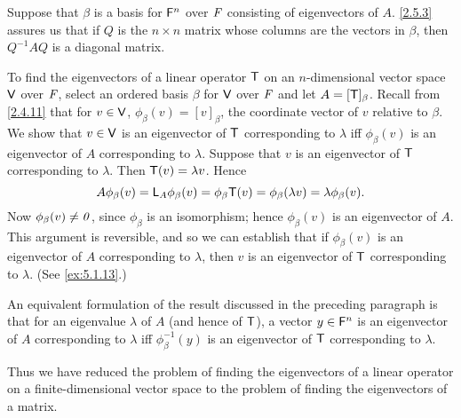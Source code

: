 \begin{note}
	Suppose that \(\beta\) is a basis for \(\mathsf{F}^n\) over \(\mathit{F}\) consisting of eigenvectors of \(A\).
	\cref{2.5.3} assures us that if \(Q\) is the \(n \times n\) matrix whose columns are the vectors in \(\beta\), then \(Q^{-1} A Q\) is a diagonal matrix.

	To find the eigenvectors of a linear operator \(\mathsf{T}\) on an \(n\)-dimensional vector space \(\mathsf{V}\) over \(\mathit{F}\), select an ordered basis \(\beta\) for \(\mathsf{V}\) over \(\mathit{F}\) and let \(A = [\mathsf{T}]_{\beta}\).
	Recall from \cref{2.4.11} that for \(v \in \mathsf{V}\), \(\phi_{\beta}(v) = [v]_{\beta}\), the coordinate vector of \(v\) relative to \(\beta\).
	We show that \(v \in \mathsf{V}\) is an eigenvector of \(\mathsf{T}\) corresponding to \(\lambda\) iff \(\phi_{\beta}(v)\) is an eigenvector of \(A\) corresponding to \(\lambda\).
	Suppose that \(v\) is an eigenvector of \(\mathsf{T}\) corresponding to \(\lambda\).
	Then \(\mathsf{T}(v) = \lambda v\).
	Hence
	\[
		A \phi_{\beta}(v) = \mathsf{L}_A \phi_{\beta}(v) = \phi_{\beta} \mathsf{T}(v) = \phi_{\beta}(\lambda v) = \lambda \phi_{\beta}(v).
	\]
	Now \(\phi_{\beta}(v) \neq \mathit{0}\), since \(\phi_{\beta}\) is an isomorphism;
	hence \(\phi_{\beta}(v)\) is an eigenvector of \(A\).
	This argument is reversible, and so we can establish that if \(\phi_{\beta}(v)\) is an eigenvector of \(A\) corresponding to \(\lambda\), then \(v\) is an eigenvector of \(\mathsf{T}\) corresponding to \(\lambda\).
	(See \cref{ex:5.1.13}.)

	An equivalent formulation of the result discussed in the preceding paragraph is that for an eigenvalue \(\lambda\) of \(A\) (and hence of \(\mathsf{T}\)), a vector \(y \in \mathsf{F}^n\) is an eigenvector of \(A\) corresponding to \(\lambda\) iff \(\phi_{\beta}^{-1}(y)\) is an eigenvector of \(\mathsf{T}\) corresponding to \(\lambda\).

	Thus we have reduced the problem of finding the eigenvectors of a linear operator on a finite-dimensional vector space to the problem of finding the eigenvectors of a matrix.
\end{note}

